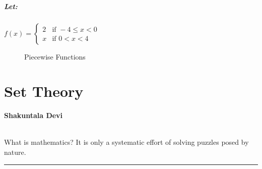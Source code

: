 \documentclass[a5paper,9pt]{book}
\theoremstyle{definition}
\newcommand{\fig}[2]{%
    \hyperref[#2]{#1~\ref*{#2}}%
}
\newcommand{\qq}[2]{%
    \begin{center}

        \begin{minipage}{0.75\textwidth}

          \hrulefill\hspace{2.5mm}\textbf{#2}\hspace{2.5mm}\hrulefill\medskip

          \hspace*{\fill}{\Large\textbf{``}}\hspace*{\fill} \\
          #1 \\[\baselineskip]
          \hspace*{\fill}{\Large\textbf{''}}\hspace*{\fill}

          \smallskip\hrule

        \end{minipage}

    \end{center}
}
\begin{document}
        \paragraph{Let:} \(f(x)=\begin{cases}
            2 & \text{if } -4 \leq x < 0 \\
            x & \text{if }  0 < x < 4
        \end{cases}\)

        \begin{figure}[ht]
          \centering
          
          \caption{Piecewise Functions}\label{fig:piecewise_functions}
        \end{figure}



    \chapter{Set Theory}%
        \label{chap:set_theory}
        \qq{What is mathematics? It is only a systematic effort of solving puzzles posed by nature.}
        {Shakuntala Devi}
        \newpage







\end{document}
